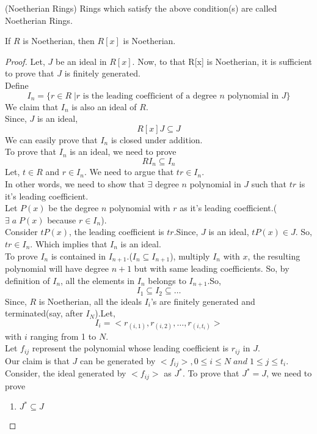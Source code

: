 \begin{definition}(Noetherian Rings)
Rings which satisfy the above condition(s) are called Noetherian Rings.
\end{definition}
\begin{theorem}
If $R$ is Noetherian, then $R[x]$ is Noetherian.
\end{theorem}
\begin{proof}
Let, $J$ be an ideal in $R[x]$. Now, to that R[x] is Noetherian, it is sufficient to prove that $J$ is finitely generated.\\
Define $$ I_n = \{r\in R\;| r \text{ is the leading coefficient of a degree } n \text{ polynomial in } J\}$$
We claim that $I_n$ is also an ideal of $R$.\\
Since, $J$ is an ideal, $$R[x]J\subseteq J$$
We can easily prove that $I_n$ is closed under addition.\\
To prove that $I_n$ is an ideal, we need to prove $$RI_n\subseteq I_n$$
Let, $t\in R$ and $r \in I_n$. We need to argue that $tr\in I_n$.\\
In other words, we need to show that $\exists$ degree $n$ polynomial in $J$ such that $tr$ is it's leading coefficient.\\
Let $P(x)$ be the degree $n$ polynomial with $r$ as it's leading coefficient.($\exists\;a\;P(x)$ because $r\in I_n$).\\
Consider $tP(x)$, the leading coefficient is $tr$.Since, $J$ is an ideal, $tP(x)\in J$. So, $tr\in I_n$. Which implies that $I_n$ is an ideal.\\
To prove $I_n$ is contained in $I_{n+1}$.($I_n\subseteq I_{n+1}$), multiply $I_n$ with $x$, the resulting polynomial will have degree $n+1$ but with same leading coefficients. So, by definition of $I_n$, all the elements in $I_n$ belongs to $I_{n+1}$.So,$$I_1\subseteq I_2 \subseteq \ldots $$
Since, $R$ is Noetherian, all the ideals $I_i$'s are finitely generated and terminated(say, after $I_N$).Let,$$ I_i=<r_{(i,1)},r_{(i,2)},\ldots,r_{(i,t_i)}>$$ with $i$ ranging from 1 to $N$.\\
Let $f_{ij}$ represent the polynomial whose leading coefficient is $r_{ij}$ in $J$.\\
Our claim is that $J$ can be generated by $<f_{ij}>,0\leq i\leq N\;and\;1\leq j \leq t_i$.\\
Consider, the ideal generated by $<f_{ij}>$ as $J^*$. To prove that $J^* = J$, we need to prove 
\begin{enumerate}
\item $J^*\subseteq J$

\end{enumerate}
\end{proof}
